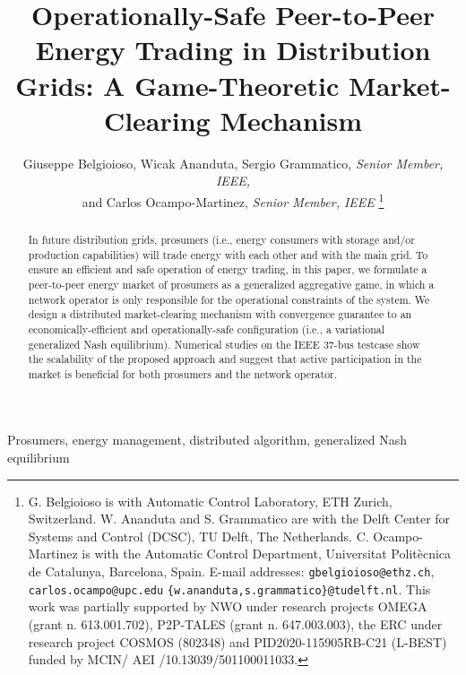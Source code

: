 \documentclass{IEEEtran}  %
\title{%
Operationally-Safe Peer-to-Peer Energy Trading in Distribution Grids: A Game-Theoretic Market-Clearing Mechanism
}
\author{Giuseppe Belgioioso, Wicak Ananduta, Sergio Grammatico, \emph{Senior Member, IEEE,} \\ and Carlos Ocampo-Martinez, \emph{Senior Member, IEEE}
\thanks{
	G. Belgioioso is with Automatic Control Laboratory, ETH Zurich, Switzerland. W. Ananduta and S. Grammatico are with the Delft Center for Systems and Control (DCSC), TU Delft, The Netherlands. C. Ocampo-Martinez is with the Automatic Control Department, Universitat Polit\`{e}cnica de Catalunya, Barcelona, Spain. 
	E-mail addresses: \texttt{gbelgioioso@ethz.ch}, \texttt{carlos.ocampo@upc.edu} \texttt{\{w.ananduta,s.grammatico\}@tudelft.nl}. This work was partially supported by NWO under research projects OMEGA (grant n. 613.001.702), P2P-TALES (grant n. 647.003.003), the ERC under research project COSMOS (802348) and PID2020-115905RB-C21 (L-BEST) funded by MCIN/ AEI /10.13039/501100011033. 
}
}
\newcommand{\0}{\mathbf{0}}
\newcommand{\1}{\mathbf{1}}
\begin{document}
\maketitle

\begin{abstract}
In future distribution grids, prosumers (i.e., energy consumers with storage and/or production capabilities) will trade energy with each other and with the main grid.
%
To ensure an efficient and safe operation of energy trading, in this paper, we formulate a peer-to-peer energy market of prosumers as a generalized aggregative game, in which a network operator is only  responsible for the operational constraints of the system.
%
We design a distributed market-clearing mechanism with convergence guarantee to an economically-efficient and operationally-safe configuration (i.e., a variational generalized Nash equilibrium). 
%
Numerical studies on the IEEE 37-bus testcase show the scalability of the proposed approach and suggest that active participation in the market is beneficial for both prosumers and the network operator.  
\end{abstract}
\vspace{-5pt}
\begin{IEEEkeywords}
	Prosumers, energy management, distributed algorithm, generalized Nash equilibrium
\end{IEEEkeywords}
\vspace{-10pt}
\end{document}
